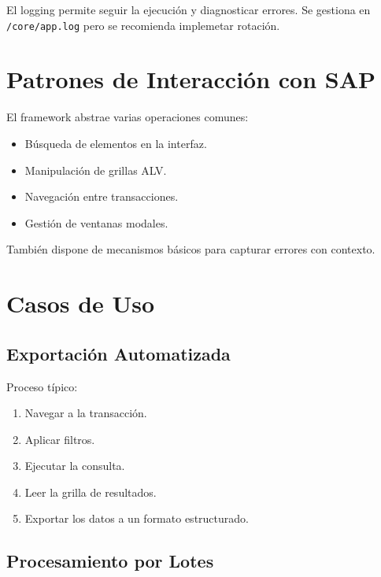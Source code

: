 \documentclass[11pt,a4paper]{article}
\begin{document}
El logging permite seguir la ejecución y diagnosticar errores. Se gestiona en \texttt{/core/app.log} pero se recomienda implemetar rotación.


\section{Patrones de Interacción con SAP}

El framework abstrae varias operaciones comunes:

\begin{itemize}
    \item Búsqueda de elementos en la interfaz.
    \item Manipulación de grillas ALV.
    \item Navegación entre transacciones.
    \item Gestión de ventanas modales.
\end{itemize}

También dispone de mecanismos básicos para capturar errores con contexto.


\section{Casos de Uso}

\subsection{Exportación Automatizada}

Proceso típico:

\begin{enumerate}
    \item Navegar a la transacción.
    \item Aplicar filtros.
    \item Ejecutar la consulta.
    \item Leer la grilla de resultados.
    \item Exportar los datos a un formato estructurado.
\end{enumerate}

\subsection{Procesamiento por Lotes}
\end{document}

